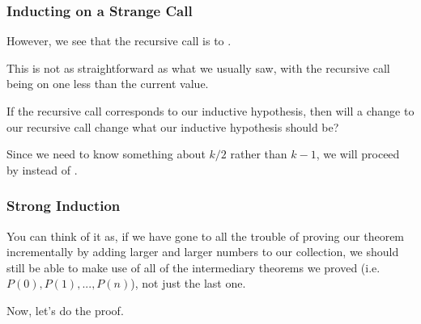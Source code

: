 \documentclass[aspectratio=169, handout]{beamer}
\begin{document}
\begin{frame}[fragile]
  \frametitle{Inducting on a Strange Call}

  However, we see that the recursive call is to .

  \pause
  \vspace{\fill}

  This is not as straightforward as what we usually saw, with the recursive
  call being on one less than the current value.

  \pause
  \vspace{\fill}

  If the recursive call corresponds to our inductive hypothesis, then will
  a change to our recursive call change what our inductive hypothesis
  should be?

  \pause
  \vspace{\fill}


  \pause
  \vspace{\fill}

  Since we need to know something about $k/2$ rather than $k - 1$, we will
  proceed by  instead of .
\end{frame}

\begin{frame}[fragile]
  \frametitle{Strong Induction}


  \pause
  \vspace{\fill}

  You can think of it as, if we have gone to all the trouble of proving our
  theorem incrementally by adding larger and larger numbers to our collection,
  we should still be able to make use of all of the intermediary theorems
  we proved (i.e. $P(0), P(1), ..., P(n)$), not just the last one.

  \vspace{\fill}

  Now, let's do the proof.
\end{frame}
\end{document}
